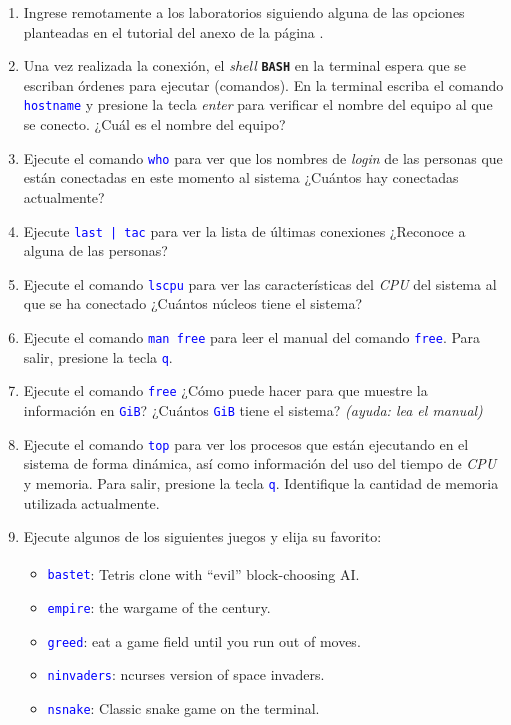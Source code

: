 \documentclass[12pt]{article}
\newcommand{\cw}[1]{\texttt{\textcolor{blue}{#1}}}
\newcommand{\bash}{\textbf{\texttt{BASH}}}
\begin{document}
\begin{enumerate}

    \item Ingrese remotamente a los laboratorios siguiendo alguna de las
        opciones planteadas en el tutorial del anexo de la página
        \pageref{sec:anexoConexion}.
        
    \item Una vez realizada la conexión, el \emph{shell} \bash{} en la
        terminal espera que se escriban órdenes para ejecutar (comandos). En
        la terminal escriba el comando \cw{hostname} y presione la tecla
        \emph{enter} para verificar el nombre del equipo al que se conecto.
        ¿Cuál es el nombre del equipo?

    \item Ejecute el comando \cw{who} para ver que los nombres de \emph{login}
        de las personas que están conectadas en este momento al sistema ¿Cuántos
        hay conectadas actualmente?

    \item Ejecute \cw{last | tac} para ver la lista de últimas conexiones
        ¿Reconoce a alguna de las personas?

    \item Ejecute el comando \cw{lscpu} para ver las características del
        \emph{CPU} del sistema al que se ha conectado ¿Cuántos núcleos tiene
        el sistema?

    \item Ejecute el comando \cw{man free} para leer el manual del comando
        \cw{free}. Para salir, presione la tecla \cw{q}.

    \item Ejecute el comando \cw{free} ¿Cómo puede hacer para que muestre la
        información en \cw{GiB}? ¿Cuántos \cw{GiB} tiene el sistema?
        \emph{(ayuda: lea el manual)}

    \item Ejecute el comando \cw{top} para ver los procesos que están
        ejecutando en el sistema de forma dinámica, así como información del
        uso del tiempo de \emph{CPU} y memoria. Para salir, presione la tecla
        \cw{q}. Identifique la cantidad de memoria utilizada actualmente.

    \item Ejecute algunos de los siguientes juegos y elija su favorito:
        \begin{itemize}
            \item \cw{bastet}: Tetris\textsuperscript{\textregistered} clone with
                ``evil'' block-choosing AI.
            \item \cw{empire}: the wargame of the century.
            \item \cw{greed}: eat a game field until you run out of moves.
            \item \cw{ninvaders}: ncurses version of space invaders.
            \item \cw{nsnake}: Classic snake game on the terminal.
        \end{itemize}

\end{enumerate}
\end{document}
